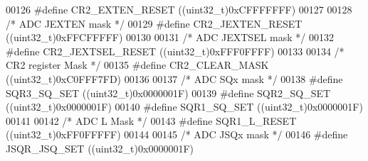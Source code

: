 \begin{DoxyCode}
00126 \textcolor{preprocessor}{#}\textcolor{preprocessor}{define} \textcolor{preprocessor}{CR2\_EXTEN\_RESET}           \textcolor{preprocessor}{(}\textcolor{preprocessor}{(}\textcolor{preprocessor}{uint32\_t}\textcolor{preprocessor}{)}0xCFFFFFFF\textcolor{preprocessor}{)}
00127 
00128 \textcolor{comment}{/* ADC JEXTEN mask */}
00129 \textcolor{preprocessor}{#}\textcolor{preprocessor}{define} \textcolor{preprocessor}{CR2\_JEXTEN\_RESET}          \textcolor{preprocessor}{(}\textcolor{preprocessor}{(}\textcolor{preprocessor}{uint32\_t}\textcolor{preprocessor}{)}0xFFCFFFFF\textcolor{preprocessor}{)}
00130 
00131 \textcolor{comment}{/* ADC JEXTSEL mask */}
00132 \textcolor{preprocessor}{#}\textcolor{preprocessor}{define} \textcolor{preprocessor}{CR2\_JEXTSEL\_RESET}         \textcolor{preprocessor}{(}\textcolor{preprocessor}{(}\textcolor{preprocessor}{uint32\_t}\textcolor{preprocessor}{)}0xFFF0FFFF\textcolor{preprocessor}{)}
00133 
00134 \textcolor{comment}{/* CR2 register Mask */}
00135 \textcolor{preprocessor}{#}\textcolor{preprocessor}{define} \textcolor{preprocessor}{CR2\_CLEAR\_MASK}            \textcolor{preprocessor}{(}\textcolor{preprocessor}{(}\textcolor{preprocessor}{uint32\_t}\textcolor{preprocessor}{)}0xC0FFF7FD\textcolor{preprocessor}{)}
00136 
00137 \textcolor{comment}{/* ADC SQx mask */}
00138 \textcolor{preprocessor}{#}\textcolor{preprocessor}{define} \textcolor{preprocessor}{SQR3\_SQ\_SET}               \textcolor{preprocessor}{(}\textcolor{preprocessor}{(}\textcolor{preprocessor}{uint32\_t}\textcolor{preprocessor}{)}0x0000001F\textcolor{preprocessor}{)}
00139 \textcolor{preprocessor}{#}\textcolor{preprocessor}{define} \textcolor{preprocessor}{SQR2\_SQ\_SET}               \textcolor{preprocessor}{(}\textcolor{preprocessor}{(}\textcolor{preprocessor}{uint32\_t}\textcolor{preprocessor}{)}0x0000001F\textcolor{preprocessor}{)}
00140 \textcolor{preprocessor}{#}\textcolor{preprocessor}{define} \textcolor{preprocessor}{SQR1\_SQ\_SET}               \textcolor{preprocessor}{(}\textcolor{preprocessor}{(}\textcolor{preprocessor}{uint32\_t}\textcolor{preprocessor}{)}0x0000001F\textcolor{preprocessor}{)}
00141 
00142 \textcolor{comment}{/* ADC L Mask */}
00143 \textcolor{preprocessor}{#}\textcolor{preprocessor}{define} \textcolor{preprocessor}{SQR1\_L\_RESET}              \textcolor{preprocessor}{(}\textcolor{preprocessor}{(}\textcolor{preprocessor}{uint32\_t}\textcolor{preprocessor}{)}0xFF0FFFFF\textcolor{preprocessor}{)}
00144 
00145 \textcolor{comment}{/* ADC JSQx mask */}
00146 \textcolor{preprocessor}{#}\textcolor{preprocessor}{define} \textcolor{preprocessor}{JSQR\_JSQ\_SET}              \textcolor{preprocessor}{(}\textcolor{preprocessor}{(}\textcolor{preprocessor}{uint32\_t}\textcolor{preprocessor}{)}0x0000001F\textcolor{preprocessor}{)}

\end{DoxyCode}
